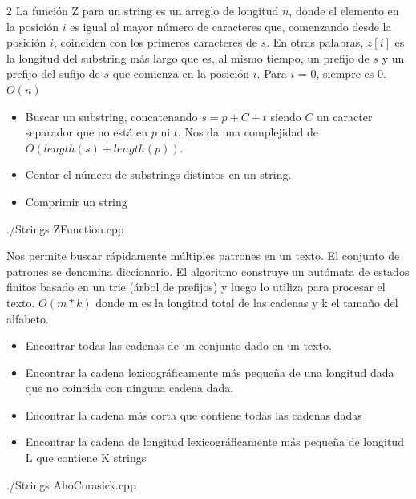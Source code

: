 \begin{multicols*}{2}
	{La función Z para un string es un arreglo de longitud $n$, donde el elemento en la posición $i$ es igual al
		mayor número de caracteres que, comenzando desde la posición $i$, coinciden con los primeros caracteres de $s$.
		En otras palabras, $z[i]$ es la longitud del substring más largo que es, al mismo tiempo, un prefijo de $s$ y un
		prefijo del sufijo de $s$ que comienza en la posición $i$. Para $i$ = 0, siempre es 0.}
	{$O(n)$}
	{\begin{itemize}
			\item Buscar un substring, concatenando $s = p + C + t$ siendo $C$ un caracter separador que no está en $p$ ni $t$.
			      Nos da una complejidad de $O(length(s) + length(p))$.
			\item Contar el número de substrings distintos en un string.
			\item Comprimir un string
		\end{itemize}}
	{./Strings}
	{ZFunction.cpp}
	
	{Nos permite buscar rápidamente múltiples patrones en un texto. El conjunto de patrones se denomina diccionario.
		El algoritmo construye un autómata de estados finitos basado en un trie (árbol de prefijos) y luego lo utiliza para procesar el texto.}
	{$O(m*k)$ donde m es la longitud total de las cadenas y k el tamaño del alfabeto.}
	{\begin{itemize}
			\item Encontrar todas las cadenas de un conjunto dado en un texto.
			\item Encontrar la cadena lexicográficamente más pequeña de una longitud dada que no coincida con ninguna cadena dada.
			\item Encontrar la cadena más corta que contiene todas las cadenas dadas
			\item Encontrar la cadena de longitud lexicográficamente más pequeña de longitud L que contiene K strings
		\end{itemize}}
	{./Strings}
	{AhoCorasick.cpp}
	
\end{multicols*}